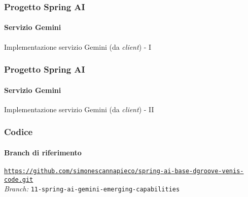 %
\begin{frame}[t,fragile] \frametitle{Progetto Spring AI}
    \framesubtitle{Servizio Gemini}
		\vspace*{-.7cm}
        \begin{block}{Implementazione servizio Gemini (da \textit{client}) - I}
{\tiny}
    \end{block}
\end{frame}
%
\begin{frame}[t,fragile] \frametitle{Progetto Spring AI}
    \framesubtitle{Servizio Gemini}
    	\vspace*{-.7cm}
        \begin{block}{Implementazione servizio Gemini (da \textit{client}) - II}
{\tiny}
    \end{block}
\end{frame}
%
\begin{frame}[fragile] \frametitle{Codice}
    \framesubtitle{Branch di riferimento}
	\begin{center}
		{\scriptsize \href{https://github.com/simonescannapieco/spring-ai-base-dgroove-venis-code.git}{\texttt{https://github.com/simonescannapieco/spring-ai-base-dgroove-venis-code.git}}}\\
		\textit{Branch:} \alert{\texttt{11-spring-ai-gemini-emerging-capabilities}}
	\end{center}
\end{frame}